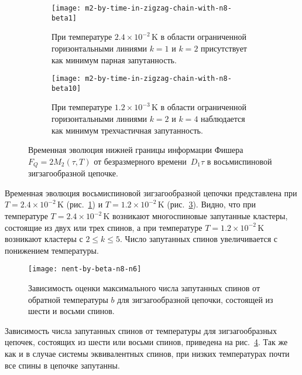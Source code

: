 \begin{figure}[H]
  \begin{subfigure}[t]{0.49\textwidth}
    \texttt{[image: m2-by-time-in-zigzag-chain-with-n8-beta1]}
    \caption{
      При температуре $2.4\times 10^{-2}\,\mbox{K}$
      в области ограниченной горизонтальными линиями $k=1$ и $k=2$
      присутствует как минимум парная запутанность.
    }
    \label{fig:fig5}
  \end{subfigure}
  \hfill
  \begin{subfigure}[t]{0.49\textwidth}
    \texttt{[image: m2-by-time-in-zigzag-chain-with-n8-beta10]}
    \caption{
       При температуре $1.2\times 10^{-3}\,\mbox{K}$
       в области ограниченной горизонтальными линиями $k=2$ и $k=4$
       наблюдается как минимум трехчастичная запутанность.
    }
    \label{fig:fig6}
  \end{subfigure}
  \caption{
    Временная эволюция нижней границы информации Фишера~$F_Q=2M_2(\tau, T)$
    от безразмерного времени~$D_1\tau$
    в восьмиспиновой зигзагообразной цепочке.
  }
\end{figure}

Временная эволюция восьмиспиновой зигзагообразной цепочки представлена при $T=2.4\times 10^{-2}\,\mbox{K}$ (рис.~\ref{fig:fig5}) и $T=1.2\times 10^{-2}\,\mbox{K}$ (рис.~\ref{fig:fig6}).  Видно, что при температуре $T=2.4\times 10^{-2}\,\mbox{K}$ возникают многоспиновые запутанные кластеры, состоящие из двух или трех спинов, а при температуре $T=1.2\times 10^{-2}\,\mbox{K}$ возникают кластеры с $2\leqslant k \leqslant 5$.
Число запутанных спинов увеличивается с понижением температуры.

\begin{figure}[H]
  \centering
  \texttt{[image: nent-by-beta-n8-n6]}
  \caption{
    Зависимость оценки максимального числа запутанных спинов от обратной температуры $b$
    для зигзагообразной цепочки,
    состоящей из шести и восьми спинов.
    }
    \label{fig:fig7}
\end{figure}

Зависимость числа запутанных спинов от температуры для зигзагообразных цепочек,
состоящих из шести или восьми спинов, приведена на рис.~\ref{fig:fig7}.
Так же как и в случае системы эквивалентных спинов,
при низких температурах почти все спины в цепочке запутанны.


